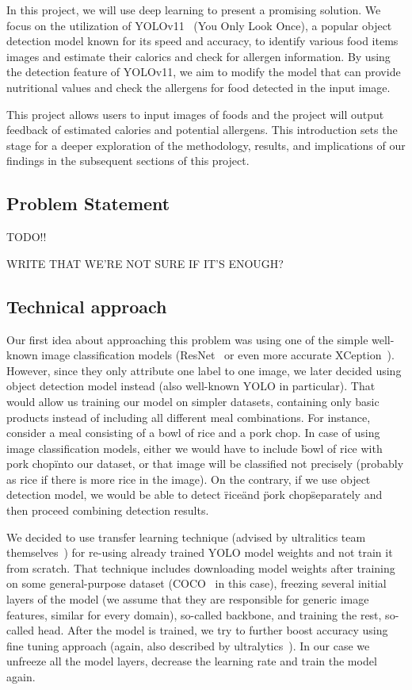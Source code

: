\documentclass[10pt,twocolumn,letterpaper]{article}
\begin{document}
In this project, we will use deep learning to present a promising solution.
We focus on the utilization of YOLOv11~\cite{redmon2016lookonceunifiedrealtime} (You Only Look Once), a popular object detection model known for its speed and accuracy, to identify various food items images and estimate their calorics and check for allergen information.
By using the detection feature of YOLOv11, we aim to modify the model that can provide nutritional values and check the allergens for food detected in the input image.

This project allows users to input images of foods and the project will output feedback of estimated calories and potential allergens.
This introduction sets the stage for a deeper exploration of the methodology, results, and implications of our findings in the subsequent sections of this project.

\subsection{Problem Statement}

TODO!!

WRITE THAT WE'RE NOT SURE IF IT'S ENOUGH?

\subsection{Technical approach}

Our first idea about approaching this problem was using one of the simple well-known image classification models (ResNet~\cite{he2015deepresiduallearningimage} or even more accurate XCeption~\cite{chollet2017xceptiondeeplearningdepthwise}).
However, since they only attribute one label to one image, we later decided using object detection model instead (also well-known YOLO in particular).
That would allow us training our model on simpler datasets, containing only basic products instead of including all different meal combinations.
For instance, consider a meal consisting of a bowl of rice and a pork chop.
In case of using image classification models, either we would have to include \"bowl of rice with pork chop\" into our dataset, or that image will be classified not precisely (probably as rice if there is more rice in the image).
On the contrary, if we use object detection model, we would be able to detect \"rice\" and \"pork chop\" separately and then proceed combining detection results.

We decided to use transfer learning technique (advised by ultralitics team themselves~\cite{ultralytics2024transferlearning}) for re-using already trained YOLO model weights and not train it from scratch.
That technique includes downloading model weights after training on some general-purpose dataset (COCO~\cite{lin2015microsoftcococommonobjects} in this case), freezing several initial layers of the model (we assume that they are responsible for generic image features, similar for every domain), so-called backbone, and training the rest, so-called head.
After the model is trained, we try to further boost accuracy using fine tuning approach (again, also described by ultralytics~\cite{ultralytics2024finetuning}).
In our case we unfreeze all the model layers, decrease the learning rate and train the model again.
\end{document}
